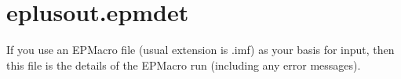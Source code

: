 \section{eplusout.epmdet}

If you use an EPMacro file (usual extension is .imf) as your basis for input, then this file is the details of the EPMacro run (including any error messages).
